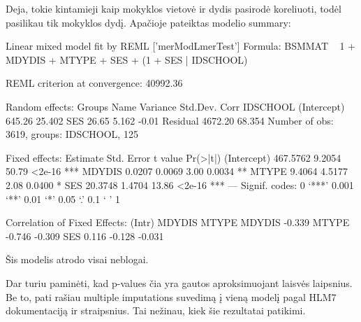 \documentclass[a4paper]{article}
\begin{document}
Deja, tokie kintamieji kaip mokyklos vietovė ir dydis pasirodė koreliuoti, todėl pasilikau tik mokyklos dydį. Apačioje pateiktas modelio summary:
\begin{Schunk}
\begin{Soutput}
Linear mixed model fit by REML ['merModLmerTest']
Formula: BSMMAT ~ 1 + MDYDIS + MTYPE + SES + (1 + SES | IDSCHOOL) 

REML criterion at convergence: 40992.36 

Random effects:
 Groups   Name        Variance Std.Dev. Corr 
 IDSCHOOL (Intercept)  645.26  25.402        
          SES           26.65   5.162   -0.01
 Residual             4672.20  68.354        
Number of obs: 3619, groups: IDSCHOOL, 125

Fixed effects:
            Estimate Std. Error t value Pr(>|t|)    
(Intercept) 467.5762     9.2054   50.79   <2e-16 ***
MDYDIS        0.0207     0.0069    3.00   0.0034 ** 
MTYPE         9.4064     4.5177    2.08   0.0400 *  
SES          20.3748     1.4704   13.86   <2e-16 ***
---
Signif. codes:  0 ‘***’ 0.001 ‘**’ 0.01 ‘*’ 0.05 ‘.’ 0.1 ‘ ’ 1

Correlation of Fixed Effects:
       (Intr) MDYDIS MTYPE 
MDYDIS -0.339              
MTYPE  -0.746 -0.309       
SES     0.116 -0.128 -0.031
\end{Soutput}
\end{Schunk}
Šis modelis atrodo visai neblogai.

Dar turiu paminėti, kad p-values čia yra gautos aproksimuojant laisvės laipsnius. Be to, pati rašiau multiple imputations suvedimą į vieną modelį pagal HLM7 dokumentaciją ir straipsnius. Tai nežinau, kiek šie rezultatai patikimi.
\end{document}
